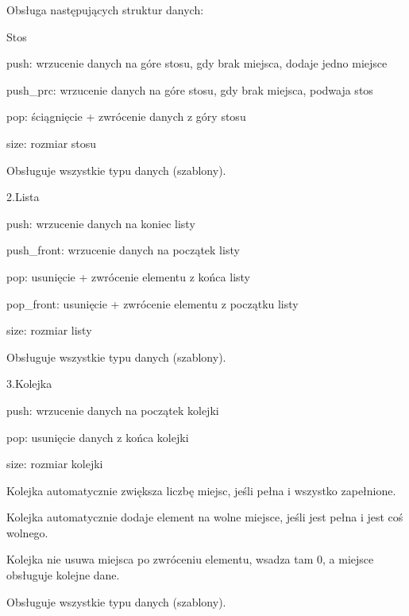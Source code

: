 Obsługa następujących struktur danych\+:


\begin{DoxyEnumerate}
\item Stos
\begin{DoxyItemize}
\item push\+: wrzucenie danych na góre stosu, gdy brak miejsca, dodaje jedno miejsce
\item push\+\_\+prc\+: wrzucenie danych na góre stosu, gdy brak miejsca, podwaja stos
\item pop\+: ściągnięcie + zwrócenie danych z góry stosu
\item size\+: rozmiar stosu
\end{DoxyItemize}

Obsługuje wszystkie typu danych (szablony).
\end{DoxyEnumerate}

2.\+Lista


\begin{DoxyItemize}
\item push\+: wrzucenie danych na koniec listy
\item push\+\_\+front\+: wrzucenie danych na początek listy
\item pop\+: usunięcie + zwrócenie elementu z końca listy
\item pop\+\_\+front\+: usunięcie + zwrócenie elementu z początku listy
\item size\+: rozmiar listy
\end{DoxyItemize}

Obsługuje wszystkie typu danych (szablony).

3.\+Kolejka


\begin{DoxyItemize}
\item push\+: wrzucenie danych na początek kolejki
\item pop\+: usunięcie danych z końca kolejki
\item size\+: rozmiar kolejki
\end{DoxyItemize}

Kolejka automatycznie zwiększa liczbę miejsc, jeśli pełna i wszystko zapełnione.

Kolejka automatycznie dodaje element na wolne miejsce, jeśli jest pełna i jest coś wolnego.

Kolejka nie usuwa miejsca po zwróceniu elementu, wsadza tam 0, a miejsce obsługuje kolejne dane.

Obsługuje wszystkie typu danych (szablony).


